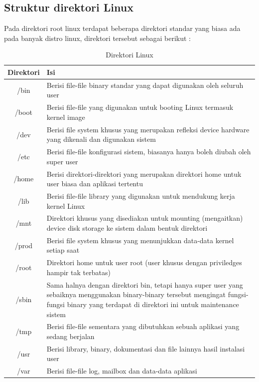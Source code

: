 \subsection{Struktur direktori Linux}
Pada direktori root linux terdapat beberapa direktori standar yang biasa ada pada banyak distro linux, direktori tersebut sebagai berikut :
\begin{table}[h]
		\caption{Direktori Linux}
		\label{direktori}
			\begin{tabular}{|c|l|}
			\hline
			\textbf{Direktori}& \textbf{Isi} \\
			\hline
			/bin&Berisi file-file binary standar yang dapat digunakan oleh seluruh user \\
			\hline
			/boot&Berisi file-file yang digunakan untuk booting Linux termasuk kernel image\\
			\hline
			/dev& Berisi file system khusus yang merupakan refleksi device hardware yang dikenali dan digunakan sistem \\
			\hline
			/etc&Berisi file-file konfigurasi sistem, biasanya hanya boleh diubah oleh super user\\
			\hline
			/home&Berisi direktori-direktori yang merupakan direktori home untuk user biasa dan aplikasi tertentu\\
			\hline
			/lib&Berisi file-file library yang digunakan untuk mendukung kerja kernel Linux\\
			\hline
			/mnt&Direktori khusus yang disediakan untuk mounting (mengaitkan) device disk storage ke sistem dalam bentuk direktori \\
			\hline
			/prod&Berisi file system khusus yang menunjukkan data-data kernel setiap saat\\
			\hline
			/root&Direktori home untuk user root (user khusus dengan priviledges hampir tak terbatas)\\
			\hline
			/sbin&Sama halnya dengan direktori bin, tetapi hanya super user yang sebaiknya menggunakan binary-binary tersebut mengingat fungsi-fungsi binary yang terdapat di direktori ini untuk maintenance sistem\\
			\hline
			/tmp&Berisi file-file sementara yang dibutuhkan sebuah aplikasi yang sedang berjalan\\
			\hline
			/usr&Berisi library, binary, dokumentasi dan file lainnya hasil instalasi user\\
			\hline
			/var&Berisi file-file log, mailbox dan data-data aplikasi\\
			\hline
		\end{tabular}
		\end{table}